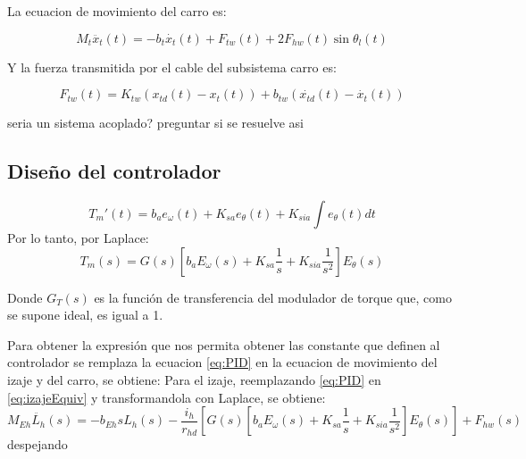 \documentclass{article}
\begin{document}
            La ecuacion de movimiento del carro es:

            \begin{equation} \label{eq:Carro}
                M_t \ddot{x_{t}}(t) = - b_t \dot{x_{t}}(t) + F_{tw}(t) + 2F_{hw}(t)\sin{\theta_l(t)}
            \end{equation}

            Y la fuerza transmitida por el cable del subsistema carro es:

            \begin{equation} \label{eq:fuerzaCableCarro}
                F_{tw}(t) = K_{tw}(x_{td}(t) - x_t(t)) + b_{tw}(\dot{x_{td}}(t) - \dot{x_t}(t))
            \end{equation}

            seria un sistema acoplado? preguntar si se resuelve asi

                
        \subsection{Diseño del controlador}

            \begin{equation}\label{eq:PID}
                T_m'(t) = b_ae_\omega(t) + K_{sa} e_\theta(t) + K_{sia}\int e_\theta(t) dt
            \end{equation}
            Por lo tanto, por Laplace:
            \begin{equation}\label{eq:PID_Laplace}
                T_m(s) = G(s)[b_aE_\omega(s) + K_{sa} \frac{1}{s} + K_{sia} \frac{1}{s^2}]E_\theta(s)
            \end{equation}

            Donde \(G_T(s)\) es la función de transferencia del modulador de torque que, como se supone ideal, es igual a 1.


            Para obtener la expresión que nos permita obtener las constante que definen al controlador se remplaza la ecuacion \ref{eq:PID} en la ecuacion de movimiento del izaje y del carro, se obtiene:
            Para el izaje, reemplazando \ref{eq:PID} en \ref{eq:izajeEquiv} y transformandola con Laplace, se obtiene:
            \begin{equation}\label{eq:izajeControl}
                M_{Eh} \ddot{L_h}(s) = - b_{Eh} sL_h(s) - \frac{i_h}{r_{hd}} [G(s)[b_aE_\omega(s) + K_{sa} \frac{1}{s} + K_{sia} \frac{1}{s^2}]E_\theta(s)] + F_{hw}(s)
            \end{equation}
            despejando 
\end{document}
